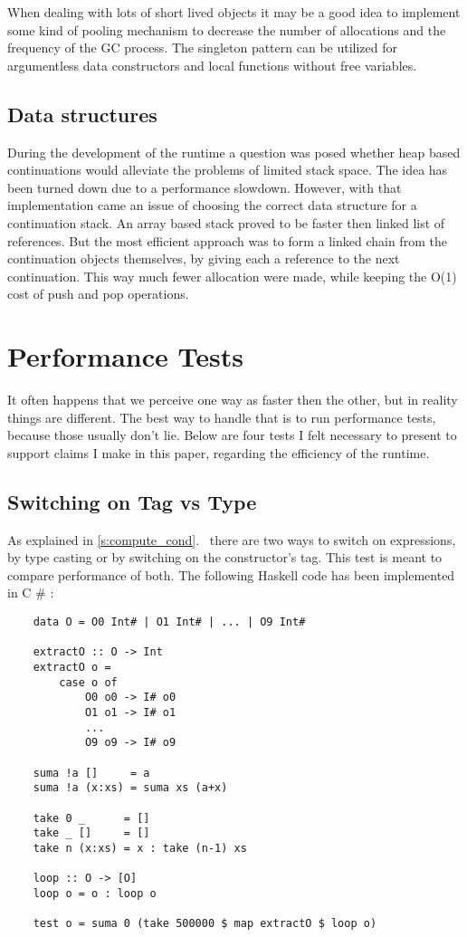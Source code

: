 \documentclass[en]{pracamgr}
\newcommand{\shrp}{%
  {\fontfamily{ppl}\selectfont\#%
  }}
\newcommand{\myref}[1]{\ref{#1}.~\textit{\nameref{#1}}}
\begin{document}
When dealing with lots of short lived objects it may be
a good idea to implement some kind of pooling mechanism
to decrease the number of allocations and the frequency of
the GC process. The singleton pattern can be utilized
for argumentless data constructors and local functions
without free variables.

\subsection{Data structures}

During the development of the runtime a question was posed
whether heap based continuations would alleviate the problems
of limited stack space. The idea has been turned down
due to a performance slowdown.
However, with that implementation came an issue
of choosing the correct data structure for a continuation stack.
An array based stack proved to be faster then linked list of references.
But the most efficient approach was to form a linked chain
from the continuation objects themselves, by giving each a reference
to the next continuation.
This way much fewer allocation were made, while keeping
the O(1) cost of push and pop operations.

\section{Performance Tests}
It often happens that we perceive one way as faster then the other,
but in reality things are different. The best way to handle that
is to run performance tests, because those usually don't lie.
Below are four tests I felt necessary to present to support
claims I make in this paper, regarding the efficiency of the runtime.

\subsection{Switching on Tag vs Type}\label{perf:switching}

As explained in \myref{s:compute_cond} there are two ways
to switch on expressions, by type casting or by switching
on the constructor's tag. This test is meant to compare
performance of both. The following Haskell code has been implemented in C\shrp{}:

\begin{verbatim}
    data O = O0 Int# | O1 Int# | ... | O9 Int#
    
    extractO :: O -> Int
    extractO o =
        case o of
            O0 o0 -> I# o0
            O1 o1 -> I# o1
            ...
            O9 o9 -> I# o9

    suma !a []     = a
    suma !a (x:xs) = suma xs (a+x)

    take 0 _      = []
    take _ []     = []
    take n (x:xs) = x : take (n-1) xs

    loop :: O -> [O]
    loop o = o : loop o

    test o = suma 0 (take 500000 $ map extractO $ loop o)
\end{verbatim}
\end{document}
